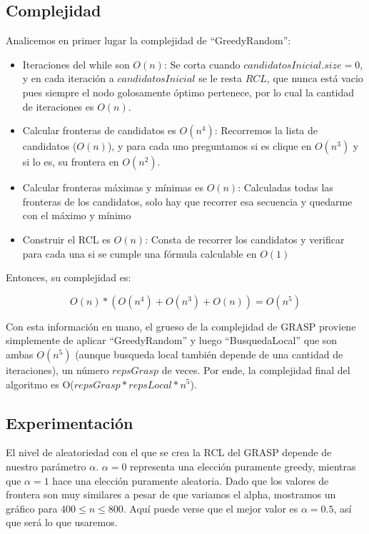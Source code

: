 \subsection{Complejidad}

Analicemos en primer lugar la complejidad de ``GreedyRandom'':
\begin{itemize}
    \item Iteraciones del while son $O(n)$: Se corta cuando $candidatosInicial.size = 0$, y en cada iteración a $candidatosInicial$ se le resta $RCL$, que nunca está vacio pues siempre el nodo golosamente óptimo pertenece, por lo cual la cantidad de iteraciones es $O(n)$.
    \item Calcular fronteras de candidatos es $O(n^4)$: Recorremos la lista de candidatos ($O(n)$), y para cada uno preguntamos si es clique en $O(n^3)$ y si lo es, su frontera en $O(n^2)$.
    \item Calcular fronteras máximas y mínimas es $O(n)$: Calculadas todas las fronteras de los candidatos, solo hay que recorrer esa secuencia y quedarme con el máximo y mínimo
    \item Construir el RCL es $O(n)$: Consta de recorrer los candidatos y verificar para cada una si se cumple una fórmula calculable en $O(1)$
\end{itemize}

Entonces, su complejidad es:

$$ O(n) * (O(n^4) + O(n^3) + O(n)) = O(n^5)$$

Con esta información en mano, el grueso de la complejidad de GRASP proviene simplemente de aplicar ``GreedyRandom'' y luego ``BusquedaLocal'' que son ambas $O(n^5)$ (aunque busqueda local también depende de una cantidad de iteraciones), un número $repsGrasp$ de veces. Por ende, la complejidad final del algoritmo es O($repsGrasp * repsLocal * n^5$).


\subsection{Experimentación}

El nivel de aleatoriedad con el que se crea la RCL del GRASP depende de nuestro parámetro $\alpha$. $\alpha = 0$ representa una elección puramente greedy, mientras que $\alpha = 1$ hace una elección puramente aleatoria. Dado que los valores de frontera son muy similares a pesar de que variamos el alpha, mostramos un gráfico para $400 \leq n \leq 800$. Aquí puede verse que el mejor valor es $\alpha = 0.5$, así que será lo que usaremos.

